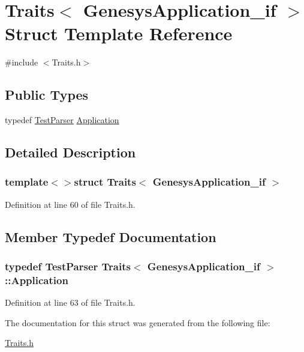 \hypertarget{struct_traits_3_01_genesys_application__if_01_4}{\section{Traits$<$ Genesys\-Application\-\_\-if $>$ Struct Template Reference}
\label{struct_traits_3_01_genesys_application__if_01_4}
}


{\ttfamily \#include $<$Traits.\-h$>$}

\subsection*{Public Types}
\begin{DoxyCompactItemize}
\item 
typedef \hyperlink{class_test_parser}{Test\-Parser} \hyperlink{struct_traits_3_01_genesys_application__if_01_4_a9429d5d11efb16c08fdb9c622d73c910}{Application}
\end{DoxyCompactItemize}


\subsection{Detailed Description}
\subsubsection*{template$<$$>$struct Traits$<$ Genesys\-Application\-\_\-if $>$}



Definition at line 60 of file Traits.\-h.



\subsection{Member Typedef Documentation}
\hypertarget{struct_traits_3_01_genesys_application__if_01_4_a9429d5d11efb16c08fdb9c622d73c910}{
\subsubsection[{Application}]{\setlength{\rightskip}{0pt plus 5cm}typedef {\bf Test\-Parser} {\bf Traits}$<$ {\bf Genesys\-Application\-\_\-if} $>$\-::{\bf Application}}}\label{struct_traits_3_01_genesys_application__if_01_4_a9429d5d11efb16c08fdb9c622d73c910}


Definition at line 63 of file Traits.\-h.



The documentation for this struct was generated from the following file\-:\begin{DoxyCompactItemize}
\item 
\hyperlink{_traits_8h}{Traits.\-h}\end{DoxyCompactItemize}
